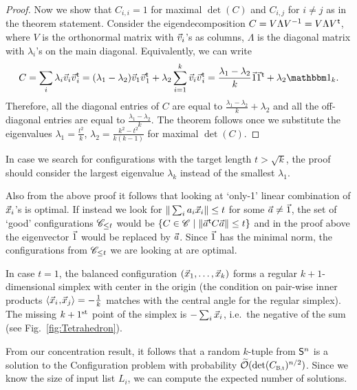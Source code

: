 \begin{proof}
	Now we show that $C_{i,i} = 1$ for maximal $\det(C)$ and $C_{i,j}$ for $i \neq j$ as in the theorem statement. Consider the eigendecomposition $C = V \Lambda V^{-1} = V \Lambda V\mkern0.7mu^{\mathsf{ t}}$, where $V$ is the orthonormal matrix with $\vvec_i$'s as columns, $\Lambda$ is the diagonal matrix with $\lambda_i$'s on the main diagonal. Equivalently, we can write
	\[
		C = \sum_i \lambda_i \vvec_i \vvec\transpose_i  = (\lambda_1 - \lambda_2) \vvec_1 \vvec\transpose_1 + \lambda_2 \sum\limits_{i=1}^k \vvec_i \vvec\transpose_i = \frac{\lambda_1 - \lambda_2}{k} \onevec \onevec\transpose + \lambda_2 \Id_k.
	\]
	Therefore, all the diagonal entries of $C$ are equal to $\tfrac{\lambda_1 - \lambda_2}{k} + \lambda_2$ and all the off-diagonal entries are equal to $\frac{\lambda_1 - \lambda_2}{k}$. The theorem follows once we substitute the eigenvalues $\lambda_1 = \tfrac{t^2}{k}$, $\lambda_2 = \tfrac{k^2 - t^2}{k(k-1)}$ for maximal $\det(C)$.
\end{proof}

In case we search for configurations with the target length $t > \sqrt{k}$, the proof should consider the largest eigenvalue $\lambda_k$ instead of the smallest $\lambda_1$.

Also from the above proof it follows that looking at `only-1' linear combination of $\vec x_i$'s is optimal. If instead we look for $\| \sum_i a_i \vec x_i \| \leq t$ for some $\vec a \neq \vec 1$, the set of `good' configurations $\mathscr{C}_{\leq t}$ would be $\{ C \in \mathscr{C} \; | \; \| \vec a\mkern0.7mu^{\mathsf{ t}} C \vec a \| \leq t  \}$ and in the proof above the eigenvector $\vec 1$ would be replaced by $\vec a$. Since $\vec 1$ has the minimal norm, the configurations from $\mathscr{C}_{\leq t}$ we are looking at are optimal.

In case $t=1$, the balanced configuration $(\vec x_1, \ldots, \vec x_k)$ forms a regular $k+1$-dimensional simplex with center in the origin (the condition on pair-wise inner products $\langle\vec x_i\!\mathbin{,}\!\vec x_j\rangle = -\tfrac{1}{k}$ matches with the central angle for the regular simplex). The missing $k+1^{\mathrm{st}}$ point of the simplex is $-\sum_i \vec x_i$, i.e.\ the negative of the sum (see Fig.~\ref{fig:Tetrahedron}).

From our concentration result, it follows that a random $k$-tuple from $\mathsf{S}^{n}$ is a solution to the Configuration problem with probability $\softO( \det(\Cbalt)^{n/2})$. Since we know the size of input list $L_i$, we can compute the expected number of solutions.


